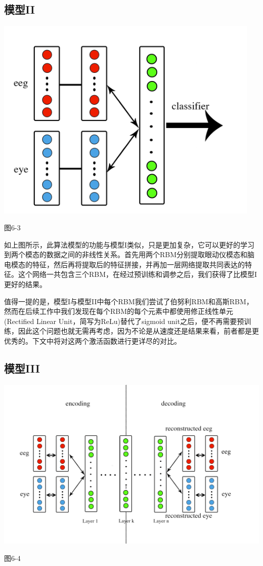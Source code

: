 	\subsection{模型II}
		\centerline{\includegraphics[width=5in]{figure/classify1.png}}
		\centerline{图6-3}
		如上图所示，此算法模型的功能与模型I类似，只是更加复杂，它可以更好的学习到两个模态的数据之间的非线性关系。首先用两个RBM分别提取眼动仪模态和脑电模态的特征，然后再将提取后的特征拼接，并再加一层网络提取共同表达的特征。这个网络一共包含三个RBM，在经过预训练和调参之后，我们获得了比模型I更好的结果。
		
		值得一提的是，模型I与模型II中每个RBM我们尝试了伯努利RBM和高斯RBM，然而在后续工作中我们发现在每个RBM的每个元素中都使用修正线性单元(Rectified Linear Unit，简写为ReLu)替代了sigmoid unit之后，便不再需要预训练，因此这个问题也就无需再考虑，因为不论是从速度还是结果来看，前者都是更优秀的。下文中将对这两个激活函数进行更详尽的对比。
	\subsection{模型III}
		\centerline{\includegraphics[width=7in]{figure/feature_learning.png}}
		\centerline{图6-4}
		
